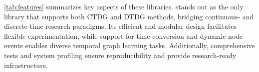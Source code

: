 \autoref{tab:features} summarizes key aspects of these libraries. \name stands out as the only library that supports both CTDG and DTDG methods, bridging continuous- and discrete-time research paradigms. Its efficient and modular design facilitates flexible experimentation, while support for time conversion and dynamic node events enables diverse temporal graph learning tasks. Additionally, comprehensive tests and system profiling ensure reproducibility and provide research-ready infrastructure.



\begin{table}[t]
\centering
\renewcommand{\arraystretch}{1}
\caption{Comparison of TGL libraries. \name is the only library that meets all desirable criteria for TGL research while other libraries lack one or more criteria.}  %
\label{tab:features}

\end{table}

